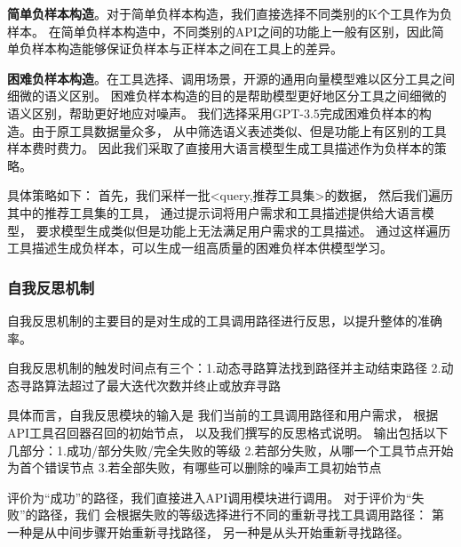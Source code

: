 \indent \textbf{简单负样本构造}。对于简单负样本构造，我们直接选择不同类别的K个工具作为负样本。
在简单负样本构造中，不同类别的API之间的功能上一般有区别，因此简单负样本构造能够保证负样本与正样本之间在工具上的差异。

\indent \textbf{困难负样本构造}。在工具选择、调用场景，开源的通用向量模型难以区分工具之间细微的语义区别。
困难负样本构造的目的是帮助模型更好地区分工具之间细微的语义区别，帮助更好地应对噪声。
我们选择采用GPT-3.5完成困难负样本的构造。由于原工具数据量众多，
从中筛选语义表述类似、但是功能上有区别的工具样本费时费力。
因此我们采取了直接用大语言模型生成工具描述作为负样本的策略。

具体策略如下：
首先，我们采样一批<query,推荐工具集>的数据，
然后我们遍历其中的推荐工具集的工具，
通过提示词将用户需求和工具描述提供给大语言模型，
要求模型生成类似但是功能上无法满足用户需求的工具描述。
通过这样遍历工具描述生成负样本，可以生成一组高质量的困难负样本供模型学习。

\subsubsection{自我反思机制}

自我反思机制的主要目的是对生成的工具调用路径进行反思，以提升整体的准确率。

自我反思机制的触发时间点有三个：1.动态寻路算法找到路径并主动结束路径 2.动态寻路算法超过了最大迭代次数并终止或放弃寻路

具体而言，自我反思模块的输入是
我们当前的工具调用路径和用户需求，
根据API工具召回器召回的初始节点，
以及我们撰写的反思格式说明。
输出包括以下几部分：1.成功/部分失败/完全失败的等级 2.若部分失败，从哪一个工具节点开始为首个错误节点 3.若全部失败，有哪些可以删除的噪声工具初始节点

评价为“成功”的路径，我们直接进入API调用模块进行调用。
对于评价为“失败”的路径，我们
会根据失败的等级选择进行不同的重新寻找工具调用路径：
第一种是从中间步骤开始重新寻找路径，
另一种是从头开始重新寻找路径。

